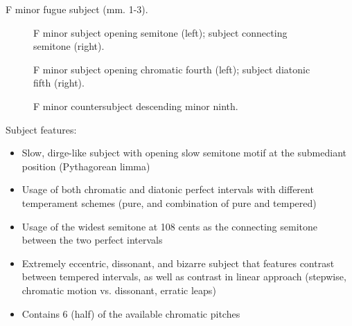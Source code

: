 \begin{Example}[H]
\vspace{1.5em}
    \centering
    \caption{ F minor fugue subject (mm. 1-3). }
\end{Example}    


\begin{figure}[H]
\vspace{1.5em}
    \centering
    \caption[F minor subject opening semitone; subject connecting semitone. ]{F minor subject opening semitone (left); subject connecting semitone (right).}
\end{figure}

\begin{figure}[H]
\vspace{1.5em}
    \centering
    \caption[F minor subject chromatic fourth; subject diatonic fifth. ]{F minor subject opening chromatic fourth (left); subject diatonic fifth (right).}
\end{figure}


\begin{figure}[H]
\vspace{1.5em}
    \centering
    \caption{F minor countersubject descending minor ninth.}
\end{figure}    Subject features:

\begin{itemize}
\tightlist
\item
  Slow, dirge-like subject with opening slow semitone motif at the
  submediant position (Pythagorean limma)
\item
  Usage of both chromatic and diatonic perfect intervals with different
  temperament schemes (pure, and combination of pure and tempered)
\item
  Usage of the widest semitone at 108 cents as the connecting semitone
  between the two perfect intervals
\item
  Extremely eccentric, dissonant, and bizarre subject that features
  contrast between tempered intervals, as well as contrast in linear
  approach (stepwise, chromatic motion vs. dissonant, erratic leaps)
\item
  Contains 6 (half) of the available chromatic pitches
\end{itemize}

